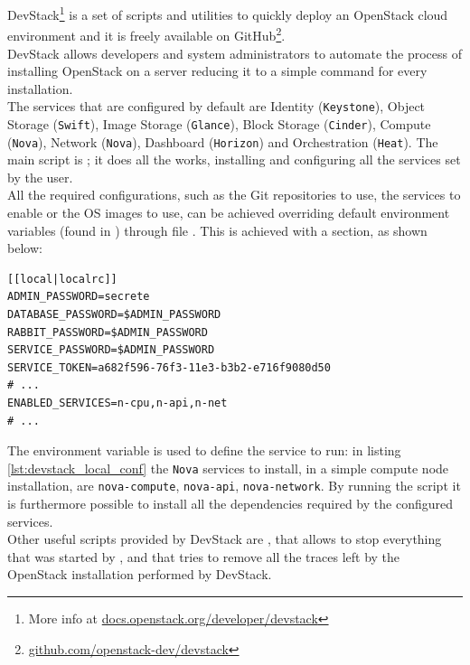 DevStack\footnote{More info at \url{docs.openstack.org/developer/devstack}} is a set of scripts and utilities to quickly deploy an OpenStack cloud environment and it is freely available on GitHub\footnote{\url{github.com/openstack-dev/devstack}}.\\
DevStack allows developers and system administrators to automate the process of installing OpenStack on a server reducing it to a simple command for every installation.\\
The services that are configured by default are Identity (\texttt{Keystone}), Object Storage (\texttt{Swift}), Image Storage (\texttt{Glance}), Block Storage (\texttt{Cinder}), Compute (\texttt{Nova}), Network (\texttt{Nova}), Dashboard (\texttt{Horizon}) and Orchestration (\texttt{Heat}).
The main script is ; it does all the works, installing and configuring all the services set by the user.\\
All the required configurations, such as the Git repositories to use, the services to enable or the OS images to use, can be achieved overriding default environment variables (found in ) through file . This is achieved with a  section, as shown below:
\begin{lstlisting}[numbers=none,label={lst:devstack_local_conf}]
[[local|localrc]]
ADMIN_PASSWORD=secrete
DATABASE_PASSWORD=$ADMIN_PASSWORD
RABBIT_PASSWORD=$ADMIN_PASSWORD
SERVICE_PASSWORD=$ADMIN_PASSWORD
SERVICE_TOKEN=a682f596-76f3-11e3-b3b2-e716f9080d50
# ...
ENABLED_SERVICES=n-cpu,n-api,n-net
# ...
\end{lstlisting}
The environment variable  is used to define the service to run: in listing \ref{lst:devstack_local_conf} the \texttt{Nova} services to install, in a simple compute node installation, are \texttt{nova-compute}, \texttt{nova-api}, \texttt{nova-network}.
By running the script  it is furthermore possible to install all the dependencies required by the configured services.\\
Other useful scripts provided by DevStack are , that allows to stop everything that was started by , and  that tries to remove all the traces left by the OpenStack installation performed by DevStack.
